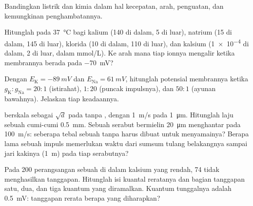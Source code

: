 \begin{exercise}[$\star$]\label{exo:b2:neurons-synapses:4}
Bandingkan  listrik dan  kimia dalam hal kecepatan,
arah, penguatan, dan kemungkinan penghambatannya.
\end{exercise}

\begin{exercise}[$\star\star$]\label{exo:b2:neurons-synapses:5}
Hitunglah  pada \qty{37}{\celsius} bagi kalium (140 di
dalam, 5 di luar), natrium (15 di dalam, 145 di luar), klorida (10 di
dalam, 110 di luar), dan kalsium (\qty{1e-4}{} di dalam, 2 di luar,
dalam \unit{mmol/L}). Ke arah mana tiap ionnya mengalir ketika
membrannya berada pada \qty{-70}{mV}?
\end{exercise}

\begin{exercise}[$\star\star$]\label{exo:b2:neurons-synapses:6}
Dengan $E_{\mathrm K} = \qty{-89}{mV}$ dan $E_{\mathrm{Na}} =
\qty{+61}{mV}$, hitunglah potensial membrannya ketika $g_{\mathrm K} :
g_{\mathrm{Na}} = 20 : 1$ (istirahat), $1 : 20$ (puncak impulsnya), dan
$50 : 1$ (ayunan bawahnya). Jelaskan tiap keadaannya.
\end{exercise}

\begin{exercise}[$\star\star$]\label{exo:b2:neurons-synapses:7}
 berskala sebagai $\sqrt d$ pada  tanpa , dengan
\qty{1}{m/s} pada \qty{1}{\micro m}. Hitunglah laju sebuah 
cumi-cumi \qty{0.5}{mm}. Sebuah serabut bermielin \qty{20}{\micro m}
menghantar pada \qty{100}{m/s}: seberapa tebal sebuah  tanpa
 harus dibuat untuk menyamainya? Berapa lama sebuah impuls
memerlukan waktu dari sumsum tulang belakangnya sampai jari kakinya
(\qty{1}{m}) pada tiap serabutnya?
\end{exercise}

\begin{exercise}[$\star\star$]\label{exo:b2:neurons-synapses:8}
Pada 200 perangsangan sebuah  di dalam kalsium yang rendah, 74
tidak menghasilkan tanggapan. Hitunglah isi kuantal reratanya dan
bagian tanggapan satu, dua, dan tiga kuantum yang diramalkan. Kuantum
tunggalnya adalah \qty{0.5}{mV}: tanggapan rerata berapa yang
diharapkan?
\end{exercise}

